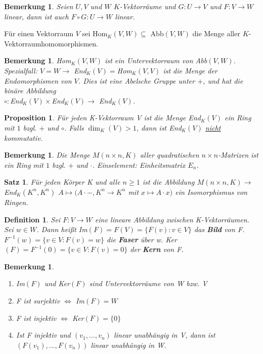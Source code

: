 \documentclass[12pt,a4paper]{article}
\theoremstyle{plain}
\newtheorem{Satz}[Theorem]{Satz}
\newtheorem{Prop}[Theorem]{Proposition}
\newtheorem{Definition}[Theorem]{Definition}
\newtheorem{Bemerkung}[Theorem]{Bemerkung}
\newcommand{\herv}[1]{{\emph{\textbf{#1}}}}
\numberwithin{equation}{section}
\begin{document}
\begin{Bemerkung}
Seien $U,V$ und $W$ $K$-Vektorräume und $G:U\rightarrow V$ und $F:V \rightarrow W$ linear, dann ist auch $F\circ G:U\rightarrow W$ linear.
\end{Bemerkung}
Für einen Vektorraum $V$ sei Hom$_K(V,W)\subseteq$ Abb$(V,W)$ die Menge aller $K$-Vektorraumho\-mo\-mor\-phis\-men.
\begin{Bemerkung}
Hom$_K(V,W)$ ist ein Untervektorraum von Abb$(V,W)$.\\
Spezialfall: $V=W \rightarrow$ End$_K(V)=$Hom$_K(V,V)$ ist die Menge der Endomorphismen von $V$. Dies ist eine Abelsche Gruppe unter $+$, und hat die binäre Abbildung \\$\circ: $End$_K(V)\times$End$_K(V) \rightarrow$ End$_K(V)$. 
\end{Bemerkung}
\begin{Prop}
Für jeden K-Vektorraum V ist die Menge \emph{End}$_K(V)$ ein Ring mit $1$ bzgl. $+$ und $\circ$. Falls $\dim_K(V)>1$, dann ist \emph{End}$_K(V)$ \underline{nicht} kommutativ.
\end{Prop}
\begin{Bemerkung}
Die Menge $M(n\times n, K)$ aller quadratischen $n\times n$-Matrizen ist ein Ring mit $1$ bzgl. $+$ und $\cdot$. Einselement: Einheitsmatrix $E_n$.
\end{Bemerkung}
\begin{Satz}
Für jeden Körper K und alle $n\geq 1$ ist die Abbildung $M(n\times n, K)\rightarrow $\emph{End}$_K(K^n,K^n)$ $A\mapsto (A\cdot -, K^n \rightarrow K^n$ mit $x\mapsto A\cdot x)$ ein Isomorphismus von Ringen.
\end{Satz}
\begin{Definition}
Sei $F:V\rightarrow W$ eine lineare Abbildung zwischen K-Vektorräumen. Sei $w\in W$. Dann heißt \emph{Im}$(F)=F(V)=\{F(v):v\in V\}$ das \herv{Bild} von F. $F^{-1}(w)=\{v\in V: F(v)=w\}$ die \herv{Faser} über w. \emph{Ker}$(F)=F^{-1}(0)=\{v\in V: F(v)=0\}$ der \herv{Kern} von F.
\end{Definition}
\begin{Bemerkung}\mbox { }
\begin{enumerate}
\renewcommand{\labelenumi}{\emph{\alph{enumi})}}
\item Im$(F)$ und Ker$(F)$ sind Untervektorräume von W bzw. V 
\item F ist surjektiv $\Leftrightarrow$ Im$(F)=W$ 
\item F ist injektiv $\Leftrightarrow$ Ker$(F)=\{0\}$
\item Ist F injektiv und $(v_1,\ldots,v_n)$ linear unabhängig in V, dann ist $(F(v_1),\ldots,F(v_n))$ linear unabhängig in W.
\end{enumerate}
\end{Bemerkung}
\end{document}
